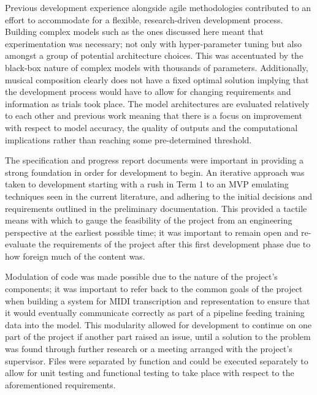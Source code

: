 \documentclass[12pt,]{article}
\begin{document}
Previous development experience alongside agile methodologies
contributed to an effort to accommodate for a flexible, research-driven
development process. Building complex models such as the ones discussed
here meant that experimentation was necessary; not only with
hyper-parameter tuning but also amongst a group of potential
architecture choices. This was accentuated by the black-box nature of
complex models with thousands of parameters. Additionally, musical
composition clearly does not have a fixed optimal solution implying that
the development process would have to allow for changing requirements
and information as trials took place. The model architectures are
evaluated relatively to each other and previous work meaning that there
is a focus on improvement with respect to model accuracy, the quality of
outputs and the computational implications rather than reaching some
pre-determined threshold.

The specification and progress report documents were important in
providing a strong foundation in order for development to begin. An
iterative approach was taken to development starting with a rush in Term
1 to an MVP emulating techniques seen in the current literature, and
adhering to the initial decisions and requirements outlined in the
preliminary documentation. This provided a tactile means with which to
gauge the feasibility of the project from an engineering perspective at
the earliest possible time; it was important to remain open and
re-evaluate the requirements of the project after this first development
phase due to how foreign much of the content was.

Modulation of code was made possible due to the nature of the project's
components; it was important to refer back to the common goals of the
project when building a system for MIDI transcription and representation
to ensure that it would eventually communicate correctly as part of a
pipeline feeding training data into the model. This modularity allowed
for development to continue on one part of the project if another part
raised an issue, until a solution to the problem was found through
further research or a meeting arranged with the project's supervisor.
Files were separated by function and could be executed separately to
allow for unit testing and functional testing to take place with respect
to the aforementioned requirements.
\end{document}
